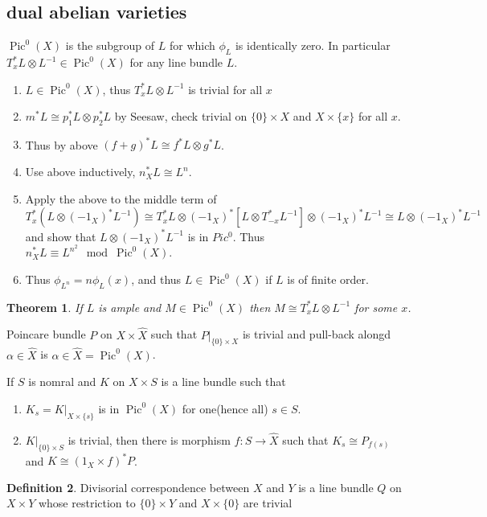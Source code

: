 \documentclass[leqno]{amsart}
\newcommand{\1}{\mathbf{1}}
\DeclareMathOperator{\Pic}{Pic}
\newtheorem{thm}{Theorem}[section]
\theoremstyle{definition}
\newtheorem{defn}[thm]{Definition}
\theoremstyle{remark}
\begin{document}
\subsection{dual abelian varieties}

$\Pic^0(X)$ is the subgroup of  $L$
for which  $\phi_L$ is identically  zero.
In particular $T_x^*L\otimes L^{-1}\in \Pic^0(X)$ 
for any line bundle $L$.
 \begin{enumerate}[label=(\alph*)]
	 \item $L\in \Pic^0(X)$, thus
		 $T_x^*L\otimes L^{-1}$ is trivial for all $x$
	 \item  $m^*L\cong p_1^*L\otimes p_2^*L$ by Seesaw,
		 check trivial on $ \{0\}\times X$
		 and $X\times \{x\}$ for all $x$.
	 \item Thus by above $(f+g)^*L\cong f^*L\otimes g^*L$.
	 \item Use above inductively,  $n_X^*L\cong L^{n}$.
	 \item Apply the above to the middle term of 
		  \[
			 T_x^*(L\otimes (-1_X)^*L^{-1})\cong 
			 T_x^*L\otimes (-1_X)^*[L\otimes T_{-x}^*L^{-1}]\otimes (-1_X)^*L^{-1}\cong L\otimes (-1_X)^*L^{-1}
		  \]
		  and show that $L\otimes(-1_X)^*L^{-1}$
		  is in $Pic^0$. Thus
		  $n_X^*L\equiv L^{n^2}\mod \Pic^0(X)$.
	  \item Thus $\phi_{L^n}=n\phi_L(x)$,
		  and thus $L\in \Pic^0(X)$
		  if  $L$ is of finite order.
\end{enumerate}

\begin{thm}
	If $L$ is ample and  $M\in \Pic^0(X)$
	then  $M\cong T_x^*L\otimes L^{-1}$ 
	for some  $x$.
\end{thm}

Poincare bundle $P$
on  $X\times \hat{X}$ 
such that $P\vert_{\{0\}\times X}$
is trivial and pull-back alongd $\alpha\in \hat{X}$
is $\alpha\in \hat{X}=\Pic^0(X)$.

If $S$ is nomral and  $K$ on  $X\times S$
is a line bundle such that 
 \begin{enumerate}[label=(\alph*)]
	\item $K_s=K\vert_{X\times\{s\}}$
		is in  $\Pic^0(X)$ for one(hence all)
		$s\in  S$.
	\item $K\vert_{\{0\}\times S}$ is trivial, then 
		there is morphism
		$f\colon S\to \hat{X}$
		such that $K_s\cong P_{f(s)}$
		and $K\cong (1_X\times f)^*P$.
\end{enumerate}


\begin{defn}
	Divisorial correspondence between $X$ and  $Y$
	is a line bundle  $Q$ on  $X\times Y$
	whose restriction to  $\{0\}\times Y$ 
	and $X\times\{0\}$ are trivial
\end{defn}
\end{document}
